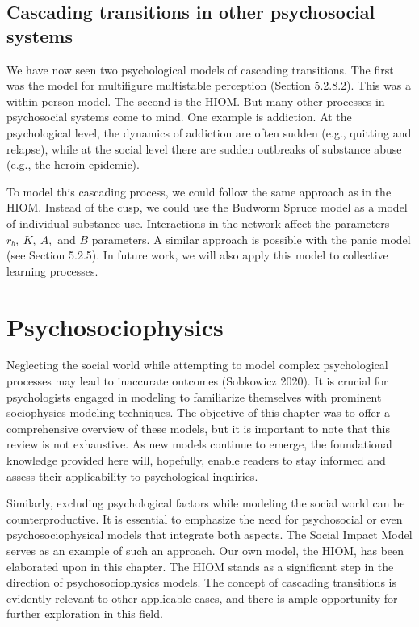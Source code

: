 \documentclass[
  letterpaper,
]{scrbook}
\begin{document}
\hypertarget{cascading-transitions-in-other-psychosocial-systems}{%
\subsection{Cascading transitions in other psychosocial
systems}\label{cascading-transitions-in-other-psychosocial-systems}}

We have now seen two psychological models of cascading transitions. The
first was the model for multifigure multistable perception (Section
5.2.8.2). This was a within-person model. The second is the HIOM. But
many other processes in psychosocial systems come to mind. One example
is addiction. At the psychological level, the dynamics of addiction are
often sudden (e.g., quitting and relapse), while at the social level
there are sudden outbreaks of substance abuse (e.g., the heroin
epidemic).

To model this cascading process, we could follow the same approach as in
the HIOM. Instead of the cusp, we could use the Budworm Spruce model as
a model of individual substance use. Interactions in the network affect
the parameters \(r_{b},\ K,\ A,\) and \(B\) parameters. A similar
approach is possible with the panic model (see Section 5.2.5). In future
work, we will also apply this model to collective learning processes.

\hypertarget{psychosociophysics}{%
\section{Psychosociophysics}\label{psychosociophysics}}

Neglecting the social world while attempting to model complex
psychological processes may lead to inaccurate outcomes (Sobkowicz
2020). It is crucial for psychologists engaged in modeling to
familiarize themselves with prominent sociophysics modeling techniques.
The objective of this chapter was to offer a comprehensive overview of
these models, but it is important to note that this review is not
exhaustive. As new models continue to emerge, the foundational knowledge
provided here will, hopefully, enable readers to stay informed and
assess their applicability to psychological inquiries.

Similarly, excluding psychological factors while modeling the social
world can be counterproductive. It is essential to emphasize the need
for psychosocial or even psychosociophysical models that integrate both
aspects. The Social Impact Model serves as an example of such an
approach. Our own model, the HIOM, has been elaborated upon in this
chapter. The HIOM stands as a significant step in the direction of
psychosociophysics models. The concept of cascading transitions is
evidently relevant to other applicable cases, and there is ample
opportunity for further exploration in this field.
\end{document}
